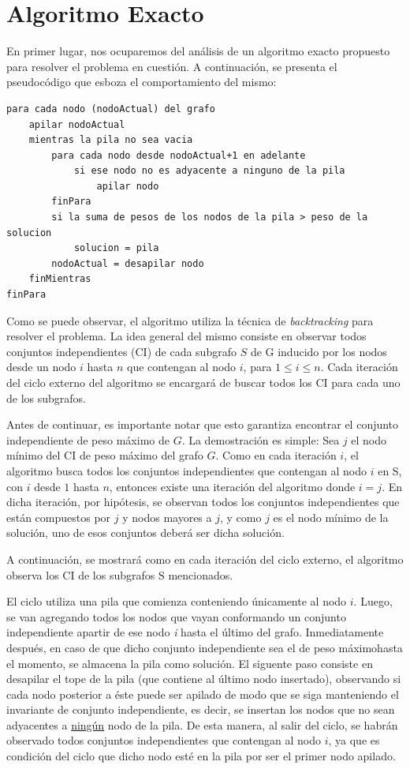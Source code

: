 \documentclass[a4paper,11pt] {article}
\begin{document}
\bigskip
\section{Algoritmo Exacto}

En primer lugar, nos ocuparemos del análisis de un algoritmo exacto propuesto para resolver el problema en cuestión. A continuación, se presenta el pseudocódigo que esboza el comportamiento del mismo:

\begin{verbatim}
para cada nodo (nodoActual) del grafo
    apilar nodoActual
    mientras la pila no sea vacia
        para cada nodo desde nodoActual+1 en adelante
            si ese nodo no es adyacente a ninguno de la pila
                apilar nodo
        finPara
        si la suma de pesos de los nodos de la pila > peso de la solucion
            solucion = pila
        nodoActual = desapilar nodo
    finMientras
finPara
\end{verbatim}

Como se puede observar, el algoritmo utiliza la técnica de \textit{backtracking} para resolver el problema. La idea general del mismo consiste en observar todos conjuntos independientes (CI) de cada subgrafo $S$ de G inducido por los nodos desde un nodo $i$ hasta $n$ que contengan al nodo $i$, para $1 \leq i \leq n$\footnotemark[1]. Cada iteración del ciclo externo del algoritmo se encargará de buscar todos los CI para cada uno de los subgrafos.

Antes de continuar, es importante notar que esto garantiza encontrar el conjunto independiente de peso máximo de $G$. La demostración es simple: Sea $j$ el nodo mínimo del CI de peso máximo del grafo $G$. Como en cada iteración $i$, el algoritmo busca todos los conjuntos independientes que contengan al nodo $i$ en S, con $i$ desde $1$ hasta $n$, entonces existe una iteración del algoritmo donde $i = j$. En dicha iteración, por hipótesis, se observan todos los conjuntos independientes que están compuestos por $j$ y nodos mayores a $j$, y como $j$ es el nodo mínimo de la solución, uno de esos conjuntos deberá ser dicha solución.

A continuación, se mostrará como en cada iteración del ciclo externo, el algoritmo observa los CI de los subgrafos S mencionados.

El ciclo utiliza una pila que comienza conteniendo únicamente al nodo $i$. Luego, se van agregando todos los nodos que vayan conformando un conjunto independiente apartir de ese nodo \textit{i} hasta el último del grafo.
Inmediatamente después, en caso de que dicho conjunto independiente sea el de peso máximo\footnotemark[2] hasta el momento, se almacena la pila como solución. El siguente paso consiste en desapilar el tope de la pila (que contiene al último nodo insertado), observando si cada nodo posterior a éste puede ser apilado de modo que se siga manteniendo el invariante de conjunto independiente, es decir, se insertan los nodos que no sean adyacentes a \underline{ningún} nodo de la pila. De esta manera, al salir del ciclo, se habrán observado todos conjuntos independientes que contengan al nodo $i$, ya que es condición del ciclo que dicho nodo esté en la pila por ser el primer nodo apilado.
\end{document}

